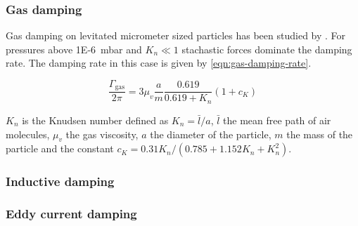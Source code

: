 \subsubsection{Gas damping}
Gas damping on levitated micrometer sized particles has been studied by \citeauthor{millen}. For pressures above \qty{1E-6}{\milli\bar} and $K_n \ll 1$ stachastic forces dominate the damping rate. The damping rate in this case is given by \autoref{eqn:gas-damping-rate}.

\begin{equation}
    \frac{\Gamma_{\text {gas}}}{2 \pi}=3 \mu_v \frac{a}{m} \frac{0.619}{0.619+K_n} \left( 1+c_K \right)
    \label{eqn:gas-damping-rate}
\end{equation}

$K_n$ is the Knudsen number defined as $K_n = \bar{l}/a$, $\bar{l}$ the mean free path of air molecules, $\mu_v$ the gas viscosity, $a$ the diameter of the particle, $m$ the mass of the particle and the constant $c_K = 0.31 K_n / \left(0.785 + 1.152 K_n + K_n^2 \right)$.

\subsubsection{Inductive damping}


\subsubsection{Eddy current damping}
